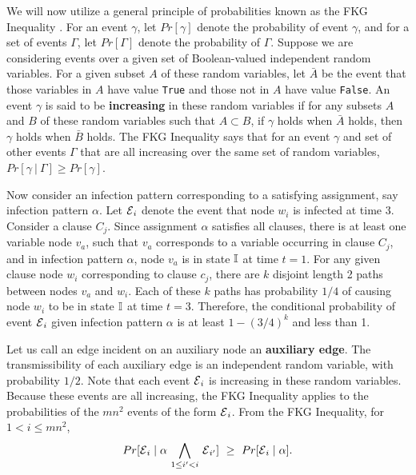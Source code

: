 We will now utilize a general principle of probabilities 
known as the FKG Inequality \cite{FKG_1971, srinivasan_1999}.
For an event $\gamma$, let $Pr[\gamma]$ denote the probability of event $\gamma$,
and for a set of events $\Gamma$, let $Pr[\Gamma]$ denote the 
probability of $\Gamma$.
Suppose we are considering events over a given set of 
Boolean-valued independent random variables.
For a given subset $A$ of these random variables,
let $\bar{A}$ be the event that those variables in $A$ have value \texttt{True} 
and those not in $A$ have value \texttt{False}. 
An event $\gamma$ is said to be {\bf increasing} in these random variables 
if for any subsets $A$ and $B$
of these random variables such that $A \subset B$,
if $\gamma$ holds when $\bar{A}$ holds, then $\gamma$ holds when $\bar{B}$ holds.
The FKG Inequality says that for an event $\gamma$ and set of other events $\Gamma$
that are all increasing over the same set of random variables,
$Pr[\gamma \:|\: \Gamma] \geq Pr[\gamma]$.


Now consider an infection pattern corresponding to a satisfying assignment, 
say infection pattern $\alpha$.
Let $\mbox{${\cal E}$}_i$ denote the event that node $w_i$ is infected at time 3. 
Consider a clause $C_j$.
Since assignment $\alpha$ satisfies all clauses,
there is at least one variable node $v_a$,
such that $v_a$ corresponds to a variable occurring in clause $C_j$,
and in infection pattern $\alpha$,
node $v_a$ is in state $\mbox{$\mathbb{I}$}$ at time $t = 1$.
For any given clause node $w_i$ corresponding to clause $c_j$,
there are $k$ disjoint length 2 paths between nodes $v_a$ and $w_i$.
Each of these $k$ paths
has probability $1/4$ of causing node $w_i$ to be 
in state $\mbox{$\mathbb{I}$}$ at time $t = 3$.
Therefore, the conditional probability of event $\mbox{${\cal E}$}_i$ 
given infection pattern $\alpha$
is at least $1 - (3/4)^k$ and less than 1.

Let us call an edge incident on an auxiliary node an {\bf auxiliary edge}.
The transmissibility of each auxiliary edge is an independent random variable, 
with probability $1/2$.
Note that each event $\mbox{${\cal E}$}_i$ is increasing in these random variables.
Because these events are all increasing, the FKG Inequality
applies to the probabilities of the $m n^2$ events of the form $\mbox{${\cal E}$}_i$.
From the FKG Inequality, for $1 < i \leq m n^2$,
$$Pr[ \mbox{${\cal E}$}_i \mid \alpha \, \bigwedge_{1\leq i' < i} \, \mbox{${\cal E}$}_{i'} ] 
   ~\geq~ Pr[ \mbox{${\cal E}$}_i \mid \alpha].$$

